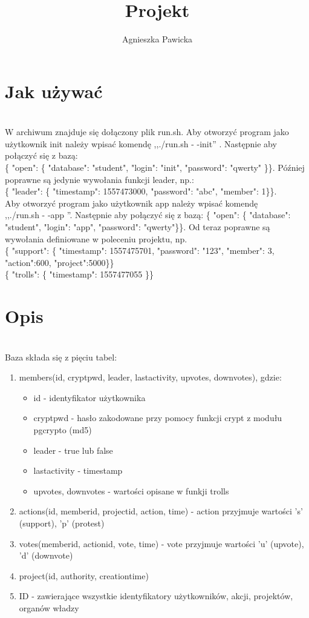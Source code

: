 \documentclass[12pt]{article}
\date{}
\title{Projekt}
\author{Agnieszka Pawicka}
\begin{document}
\thispagestyle{empty}
\maketitle
\section{Jak używać}
\\\indent W archiwum znajduje się dołączony plik run.sh. Aby otworzyć program jako użytkownik init należy wpisać komendę ,,./run.sh  - -init'' . Następnie aby połączyć się z bazą: \\ \{ "open": \{ "database": "student", "login": "init", "password": "qwerty" \}\}. Później poprawne są jedynie wywołania funkcji leader, np.: \\ \{ "leader": \{ "timestamp": 1557473000, "password": "abc", "member": 1\}\}.
\\\indent Aby otworzyć program jako użytkownik app należy wpisać komendę \\,,./run.sh  - -app ''. Następnie aby połączyć się z bazą: \{ "open": \{ "database": "student", "login": "app", "password": "qwerty"\}\}. Od teraz poprawne są wywołania definiowane w poleceniu projektu, np.\\ \{ "support": \{ "timestamp": 1557475701, "password": "123", "member": 3, "action":600, "project":5000\}\}\\
\{ "trolls": \{ "timestamp": 1557477055 \}\}

\section{Opis}
\\Baza składa się z pięciu tabel:
\begin{enumerate}
\item members(id, cryptpwd, leader, lastactivity, upvotes, downvotes), gdzie:
\begin{itemize}
\item id - identyfikator użytkownika
\item cryptpwd - hasło zakodowane przy pomocy funkcji crypt z modułu pgcrypto (md5)
\item leader - true lub false
\item lastactivity - timestamp
\item upvotes, downvotes - wartości opisane w funkji trolls
\end{itemize}
\item actions(id, memberid, projectid, action, time)  - action przyjmuje wartości 's' (support), 'p' (protest)
\item votes(memberid, actionid, vote, time) - vote przyjmuje wartości 'u' (upvote), 'd' (downvote)
\item project(id, authority, creationtime)
\item ID - zawierające wszystkie identyfikatory użytkowników, akcji, projektów, organów władzy
\end{enumerate}
\end{document}
